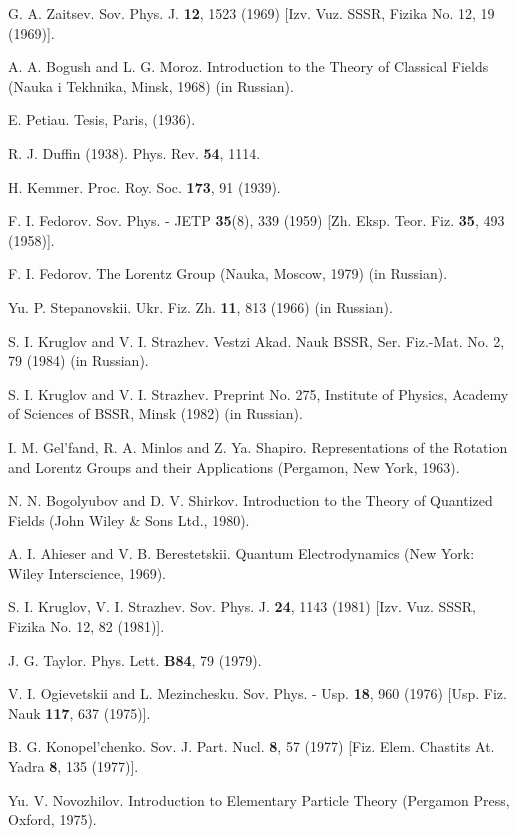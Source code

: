 \documentclass[a4paper,12pt]{article}
\begin{document}
\begin{thebibliography}{99}
\bibitem{}  G. A. Zaitsev. Sov. Phys. J. \textbf{12}, 1523 (1969) [Izv. Vuz.
SSSR, Fizika No. 12, 19 (1969)].

\bibitem{}  A. A. Bogush and L. G. Moroz. Introduction to the Theory
of Classical Fields (Nauka i Tekhnika, Minsk, 1968) (in Russian).

\bibitem{}  E. Petiau. Tesis, Paris, (1936).

\bibitem{}  R. J. Duffin (1938). Phys. Rev. \textbf{54}, 1114.

\bibitem{}  H. Kemmer. Proc. Roy. Soc. \textbf{173}, 91 (1939).

\bibitem{}  F. I. Fedorov. Sov. Phys. - JETP \textbf{35}(8), 339 (1959) [Zh.
Eksp. Teor. Fiz. \textbf{35}, 493 (1958)].

\bibitem{}  F. I. Fedorov. The Lorentz Group (Nauka, Moscow, 1979) (in
Russian).

\bibitem{}  Yu. P. Stepanovskii. Ukr. Fiz. Zh. \textbf{11}, 813 (1966) (in
Russian).

\bibitem{}  S. I. Kruglov and V. I. Strazhev. Vestzi Akad. Nauk BSSR,
Ser. Fiz.-Mat. No. 2, 79 (1984) (in Russian).

\bibitem{}  S. I. Kruglov and V. I. Strazhev. Preprint No. 275,
Institute of Physics, Academy of Sciences of BSSR, Minsk (1982)
(in Russian).

\bibitem{}  I. M. Gel'fand, R. A. Minlos and Z. Ya. Shapiro.
Representations of the Rotation and Lorentz Groups and their
Applications (Pergamon, New York, 1963).

\bibitem{}  N. N. Bogolyubov and D. V. Shirkov. Introduction to the
Theory of Quantized Fields (John Wiley \& Sons Ltd., 1980).

\bibitem{}  A. I. Ahieser and V. B. Berestetskii. Quantum
Electrodynamics (New York: Wiley Interscience, 1969).

\bibitem{}  S. I. Kruglov, V. I. Strazhev. Sov. Phys. J. \textbf{24},
1143 (1981) [Izv. Vuz. SSSR, Fizika No. 12, 82 (1981)].

\bibitem{}  J. G. Taylor. Phys. Lett. \textbf{B84}, 79 (1979).

\bibitem{}  V. I. Ogievetskii and L. Mezinchesku. Sov. Phys. - Usp.
\textbf{18}, 960 (1976) [Usp. Fiz. Nauk \textbf{117}, 637 (1975)].

\bibitem{}  B. G. Konopel'chenko. Sov. J. Part. Nucl. \textbf{8}, 57 (1977)
[Fiz. Elem. Chastits At. Yadra \textbf{8}, 135 (1977)].

\bibitem{}  Yu. V. Novozhilov. Introduction to Elementary Particle
Theory (Pergamon Press, Oxford, 1975).


\end{thebibliography}
\end{document}
